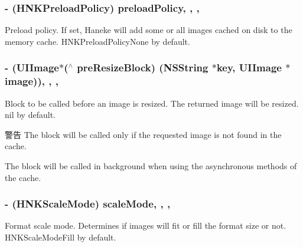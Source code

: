 \subsubsection[{preload\+Policy}]{\setlength{\rightskip}{0pt plus 5cm}-\/ (H\+N\+K\+Preload\+Policy) preload\+Policy\hspace{0.3cm}{\ttfamily [read]}, {\ttfamily [write]}, {\ttfamily [nonatomic]}, {\ttfamily [assign]}}\label{interface_h_n_k_cache_format_a8cf73fa8bf0b16d18bf3040ba05432ce}
Preload policy. If set, Haneke will add some or all images cached on disk to the memory cache. H\+N\+K\+Preload\+Policy\+None by default. \hypertarget{interface_h_n_k_cache_format_ab7d4412f1d6a87036f8a3b670cd028e9}{}
\subsubsection[{pre\+Resize\+Block}]{\setlength{\rightskip}{0pt plus 5cm}-\/ (U\+I\+Image$\ast$($^\wedge$ pre\+Resize\+Block) (N\+S\+String $\ast$key, U\+I\+Image $\ast$image))\hspace{0.3cm}{\ttfamily [read]}, {\ttfamily [write]}, {\ttfamily [nonatomic]}, {\ttfamily [copy]}}\label{interface_h_n_k_cache_format_ab7d4412f1d6a87036f8a3b670cd028e9}
Block to be called before an image is resized. The returned image will be resized. nil by default. \begin{DoxyWarning}{警告}
The block will be called only if the requested image is not found in the cache. 

The block will be called in background when using the asynchronous methods of the cache. 
\end{DoxyWarning}
\hypertarget{interface_h_n_k_cache_format_aed4283be1c435789db25798ebe64d90c}{}
\subsubsection[{scale\+Mode}]{\setlength{\rightskip}{0pt plus 5cm}-\/ (H\+N\+K\+Scale\+Mode) scale\+Mode\hspace{0.3cm}{\ttfamily [read]}, {\ttfamily [write]}, {\ttfamily [nonatomic]}, {\ttfamily [assign]}}\label{interface_h_n_k_cache_format_aed4283be1c435789db25798ebe64d90c}
Format scale mode. Determines if images will fit or fill the format size or not. H\+N\+K\+Scale\+Mode\+Fill by default. \hypertarget{interface_h_n_k_cache_format_a23bcc9d23bed21b1113f28ee296c59f9}{}
